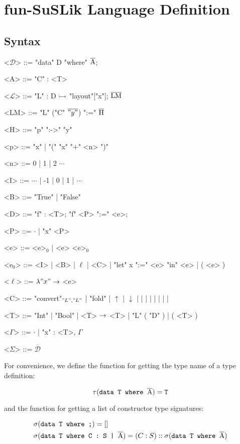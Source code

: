 \documentclass[10pt]{article}
\begin{document}
\section{fun-SuSLik Language Definition}
\label{sec:FSDef}
\subsection{Syntax}

\begin{grammar}
  <$\mathcal{D}$> ::= "data" D "where" $\overline{\textnormal{A}}$;

  <A> ::= "C" : <T>

  <$\mathcal{L}$> ::= "L" : D $\rightarrowtail$ "layout"["x"]; $\overline{\textnormal{LM}}$

  <LM> ::= "L" ("C" $\overline{"y"}$) ":=" $\overline{\textnormal{H}}$

  <H> ::= "p" ":->" "y"

  <p> ::= "x" | "(" "x" "+" <n> ")"

  <n> ::= 0 | 1 | 2 $\cdots$

  <I> ::= $\cdots$ | -1 | 0 | 1 | $\cdots$

  <B> ::= "True" | "False"

  <D> ::= "f" : <T>; "f" <P> ":=" <e>;

  <P> ::= $\cdot$ | "x" <P>

  <e> ::= <e>$_0$ | <e> <e>$_0$

  <e$_0$> ::= <I> | <B> | $\ell$ | <C> | "let" x ":=" <e> "in" <e> | ( <e> )

  <$\ell$> ::= $\lambda "x" \rightarrow$ <e>

  <C> ::= "convert"$_{"L","L"}$ | "fold" | $\uparrow$ | $\downarrow$ | \ite\; | \lesseq\; | \eq\; | \add\; | \sub\; | \; | \; | 

  <T> ::= "Int" | "Bool" | <T> $\rightarrow$ <T> | "L" ( "D" ) | ( <T> )

  <$\Gamma$> ::= $\cdot$ | "x" : <T>, $\Gamma$

  <$\Sigma$> ::= $\overline{\mathcal{D}}$
\end{grammar}

\noindent
For convenience, we define the function for getting the type name of a type definition:

\[
  \tau(\texttt{data T where }\overline{\textnormal{A}}) = \texttt{T}
\]

and the function for getting a list of constructor type signatures:

\begin{align*}
  &\sigma(\texttt{data T where ;}) = []
  \\
  &\sigma(\texttt{data T where C : S | }\overline{\textnormal{A}}) = (C : S) :: \sigma({\texttt{data T where }}\overline{\textnormal{A}})
\end{align*}
\end{document}
